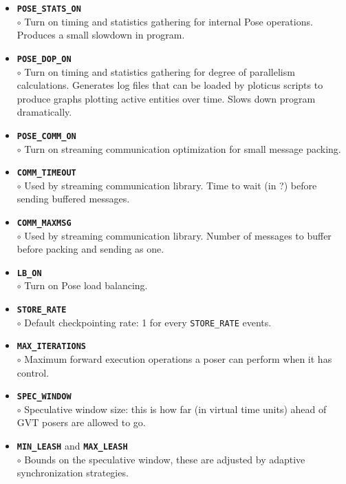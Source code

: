 \documentclass[10pt]{article}
\newcommand{\pose}{{\sc Pose}}
\begin{document}
\begin{itemize}
\item {\tt {\bf POSE\_STATS\_ON}}\\
	$\circ$ Turn on timing and statistics gathering for internal \pose{}
	operations.  Produces a small slowdown in program.\\
\item {\tt {\bf POSE\_DOP\_ON}}\\
	$\circ$ Turn on timing and statistics gathering for degree of parallelism calculations.  Generates log files that can be loaded by ploticus scripts to produce graphs plotting active entities over time.  Slows down program dramatically.\\
\item {\tt {\bf POSE\_COMM\_ON}}\\
	$\circ$ Turn on streaming communication optimization for small message packing.\\
\item {\tt {\bf COMM\_TIMEOUT}}\\
	$\circ$ Used by streaming communication library. Time to wait (in ?) before sending buffered messages.\\
\item {\tt {\bf COMM\_MAXMSG}}\\
	$\circ$ Used by streaming communication library.  Number of messages to buffer before packing and sending as one.\\
\item {\tt {\bf LB\_ON}}\\
	$\circ$ Turn on \pose{} load balancing.\\
\item {\tt {\bf STORE\_RATE}}\\
	$\circ$ Default checkpointing rate: 1 for every {\tt STORE\_RATE} events.\\
\item {\tt {\bf MAX\_ITERATIONS}}\\
	$\circ$ Maximum forward execution operations a poser can perform when it has control.\\
\item {\tt {\bf SPEC\_WINDOW}}\\
	$\circ$ Speculative window size: this is how far (in virtual time units) ahead of GVT posers are allowed to go.\\
\item {\tt {\bf MIN\_LEASH}} and {\tt {\bf MAX\_LEASH}}\\
	$\circ$ Bounds on the speculative window, these are adjusted by adaptive synchronization strategies.\\

\end{itemize}
\end{document}
